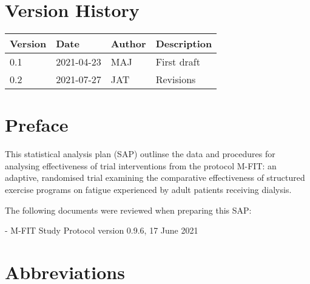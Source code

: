 \documentclass[
]{article}
\title{\currentTitle}
\subtitle{}
\author{}
\date{\vspace{-2.5em}\currentVersion}
\begin{document}
\maketitle

{
  \setcounter{tocdepth}{2}
  \tableofcontents
}

\hypertarget{version-history}{%
  \section*{Version History}\label{version-history}}

\begin{table}[H]
  \renewcommand{\arraystretch}{1.5}
  \begin{center}
    \begin{tabular}{lllp{5cm}}
      \hline
      Version & Date       & Author & Description   \\ \hline
      0.1     & 2021-04-23 & MAJ    & First draft   \\
      0.2     & 2021-07-27 & JAT    & Revisions \\
      \hline
    \end{tabular}
  \end{center}
\end{table}

\clearpage

\hypertarget{preface}{%
  \section*{Preface}\label{Preface}}

This statistical analysis plan (SAP) outlinse the data and procedures for analysing effectiveness of trial interventions from the protocol M-FIT: an adaptive, randomised trial examining the comparative effectiveness of structured exercise programs on fatigue experienced by adult patients receiving dialysis.

The following documents were reviewed when preparing this SAP:

- M-FIT Study Protocol version 0.9.6, 17 June 2021

\clearpage

\hypertarget{abbreviations}{%
  \section*{Abbreviations}\label{abbreviations}}
\end{document}
